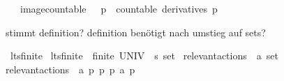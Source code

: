 \begin{isabellebody}
\ \ \ {\isacartoucheopen}image{\isacharunderscore}{\kern0pt}countable\ {\isasymequiv}\ {\isacharparenleft}{\kern0pt}{\isasymforall}\ p\ {\isasymalpha}{\isachardot}{\kern0pt}\ countable\ {\isacharparenleft}{\kern0pt}derivatives\ p\ {\isasymalpha}{\isacharparenright}{\kern0pt}{\isacharparenright}{\kern0pt}{\isacartoucheclose}%
\begin{isamarkuptext}%
stimmt definition? definition benötigt nach umstieg auf sets?%
\end{isamarkuptext}\isamarkuptrue%
\isamarkupfalse%
\ lts{\isacharunderscore}{\kern0pt}finite\ \isanewline
{\isacartoucheopen}lts{\isacharunderscore}{\kern0pt}finite\ {\isasymequiv}\ {\isacharparenleft}{\kern0pt}finite\ {\isacharparenleft}{\kern0pt}UNIV\ {\isacharcolon}{\kern0pt}{\isacharcolon}{\kern0pt}\ {\isacharprime}{\kern0pt}s\ set{\isacharparenright}{\kern0pt}{\isacharparenright}{\kern0pt}{\isacartoucheclose}\isanewline
\isanewline
{}\isamarkupfalse%
\ relevant{\isacharunderscore}{\kern0pt}actions\ {\isacharcolon}{\kern0pt}{\isacharcolon}{\kern0pt}\ {\isacartoucheopen}{\isacharprime}{\kern0pt}a\ set{\isacartoucheclose}\isanewline
\ \ \isanewline
{\isacartoucheopen}relevant{\isacharunderscore}{\kern0pt}actions\ {\isasymequiv}\ {\isacharbraceleft}{\kern0pt}a{\isachardot}{\kern0pt}\ {\isasymexists}p\ p{\isacharprime}{\kern0pt}{\isachardot}{\kern0pt}\ p\ {\isasymmapsto}a\ p{\isacharprime}{\kern0pt}{\isacharbraceright}{\kern0pt}{\isacartoucheclose}\isanewline
\isanewline
\isanewline
{}\isamarkupfalse%
\isanewline
%
\isadelimtheory
%
\endisadelimtheory
%
\isatagtheory
%
\endisatagtheory
{\isafoldtheory}%
%
\isadelimtheory
%
\endisadelimtheory
%
\end{isabellebody}%
\endinput
